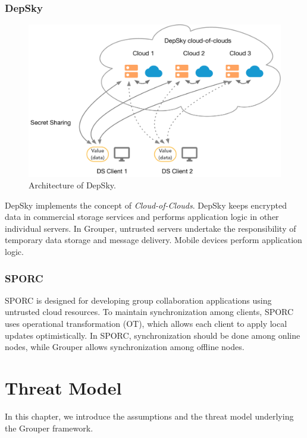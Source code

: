 \documentclass[a4paper,11pt]{report}
\begin{document}
\subsection{DepSky}

\begin{figure}
	\centering
	\includegraphics[scale=0.6]{depsky}
	\caption{Architecture of DepSky.}
	\label{fig:depsky}
\end{figure}

DepSky\cite{bessani2013depsky} implements the concept of \emph{Cloud-of-Clouds}.  
DepSky keeps encrypted data in commercial storage services and performs application logic in other individual servers.
In Grouper, untrusted servers undertake the responsibility of temporary data storage and message delivery.
Mobile devices perform application logic.

\subsection{SPORC}

SPORC\cite{feldman2010sporc} is designed for developing group collaboration applications using untrusted cloud resources.
To maintain synchronization among clients, SPORC uses operational transformation (OT), which allows each client to apply local updates optimistically.
In SPORC, synchronization should be done among online nodes, while Grouper allows synchronization among offline nodes.

\chapter{Threat Model} \label{chapter:threat_model}

In this chapter, we introduce the assumptions and the threat model underlying the Grouper framework.
\end{document}
